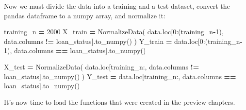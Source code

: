 \documentclass[
]{book}
\newenvironment{Shaded}{\begin{snugshade}}{\end{snugshade}}
\newcommand{\DecValTok}[1]{\textcolor[rgb]{0.00,0.00,0.81}{#1}}
\newcommand{\NormalTok}[1]{#1}
\newcommand{\OperatorTok}[1]{\textcolor[rgb]{0.81,0.36,0.00}{\textbf{#1}}}
\newcommand{\StringTok}[1]{\textcolor[rgb]{0.31,0.60,0.02}{#1}}
\begin{document}
Now we must divide the data into a training and a test dataset, convert the pandas dataframe to a numpy array, and normalize it:

\begin{Shaded}
\begin{Highlighting}[]
\NormalTok{training\_n }\OperatorTok{=} \DecValTok{2000}
\NormalTok{X\_train }\OperatorTok{=}\NormalTok{ NormalizeData( data.loc[}\DecValTok{0}\NormalTok{:(training\_n}\OperatorTok{{-}}\DecValTok{1}\NormalTok{), data.columns }\OperatorTok{!=} \StringTok{\textquotesingle{}loan\_status\textquotesingle{}}\NormalTok{].to\_numpy() )}
\NormalTok{Y\_train }\OperatorTok{=}\NormalTok{ data.loc[}\DecValTok{0}\NormalTok{:(training\_n}\OperatorTok{{-}}\DecValTok{1}\NormalTok{), data.columns }\OperatorTok{==} \StringTok{\textquotesingle{}loan\_status\textquotesingle{}}\NormalTok{].to\_numpy()}

\NormalTok{X\_test }\OperatorTok{=}\NormalTok{ NormalizeData( data.loc[training\_n:, data.columns }\OperatorTok{!=} \StringTok{\textquotesingle{}loan\_status\textquotesingle{}}\NormalTok{].to\_numpy() )}
\NormalTok{Y\_test }\OperatorTok{=}\NormalTok{ data.loc[training\_n:, data.columns }\OperatorTok{==} \StringTok{\textquotesingle{}loan\_status\textquotesingle{}}\NormalTok{].to\_numpy()}
\end{Highlighting}
\end{Shaded}

It's now time to load the functions that were created in the preview chapters.
\end{document}
